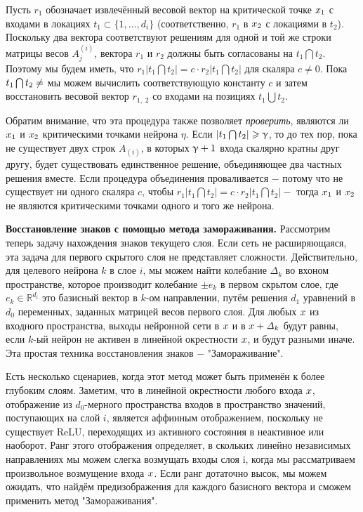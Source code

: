 Пусть $r_{1}$ обозначает извлечённый весовой вектор на критической точке $\mathnormal{x}_{1}$ с входами в локациях $t_{1} \subset \{1, \dots, d_{i}\}$ (соответственно, $r_{1}$ в $\mathnormal{x}_{2}$ с локациями в  $t_{2}$). Поскольку два вектора соответствуют решениям для одной и той же строки матрицы весов ${A}_{j}^ {\left(i\right)}$, вектора $r_{1}$ и $r_{2}$ должны быть согласованы на $t_{1} \bigcap t_{2}$. Поэтому мы будем иметь, что $r_{1} \left |t_{1} \bigcap t_{2} \right| = c \cdot  r_{2} \left | t_{1} \bigcap t_{2} \right|$ для скаляра $c \not = 0$. Пока $t_{1} \bigcap t_{2} \not = \empty$ мы можем вычислить соответствующую константу $c$ и затем восстановить весовой вектор $r_{1,\;2}$ со входами на позициях  $t_{1} \bigcup t_{2}$.

Обратим внимание, что эта процедура также позволяет \textit{проверить}, являются ли $\mathnormal{x}_{1}$ и $\mathnormal{x}_{2}$ критическими точками нейрона $\eta$. Если  $\left | t_{1} \bigcap t_{2} \right | \geqslant \upgamma$, то до тех пор, пока не существует двух строк $A_{\left(i\right)}$, в которых $\upgamma + 1$ входа скалярно кратны друг другу, будет существовать единственное решение, объединяющее два частных решения вместе. Если процедура объединения проваливается $-$ потому что не существует ни одного скаляра $c$, чтобы  $r_{1} \left |t_{1} \bigcap t_{2} \right| = c \cdot  r_{2} \left | t_{1} \bigcap t_{2} \right| -$ тогда $\mathnormal{x}_{1}$ и $\mathnormal{x}_{2}$ не являются критическими точками одного и того же нейрона.

\textbf{Восстановление знаков с помощью метода замораживания.}  Рассмотрим теперь задачу нахождения знаков текущего слоя. Если сеть не расширяющаяся, эта задача для первого скрытого слоя не представляет сложности. Действительно, для целевого нейрона $k$ в слое $i$, мы можем найти колебание $\mathit{\Delta}_{k}$ во вхоном пространстве, которое производит колебание $\pm e_{k}$ в первом скрытом слое, где $e_{k} \in \mathbb{R}^{d_{i}}$ это базисный вектор в $k$-ом направлении, путём решения $d_{1}$ уравнений в $d_{0}$ переменных, заданных матрицей весов первого слоя. Для любых $\mathnormal{x}$ из входного пространства, выходы нейронной сети в $\mathnormal{x}$ и в ${\mathnormal{x} + \mathit{\Delta}_{k}}$ будут равны, если $k$-ый нейрон не активен в линейной окрестности $\mathnormal{x}$, и будут разными иначе. Эта  простая техника восстановления знаков $-$ "Замораживание".

Есть несколько сценариев, когда этот метод может быть применён к более глубоким слоям. Заметим, что в линейной окрестности любого входа $\mathnormal{x}$, отображение из $d_{0}$-мерного пространства входов в пространство значений, поступающих на слой $i$, является аффинным отображением, поскольку не существует ReLU, переходящих из активного состояния в неактивное или наоборот. Ранг этого отображения определяет, в скольких линейно независимых направлениях мы можем слегка возмущать входы слоя i, когда мы рассматриваем произвольное возмущение входа $\mathnormal{x}$. Если ранг дотаточно высок, мы можем ожидать, что найдём предизображения для каждого базисного вектора и сможем применить метод "Замораживания".

